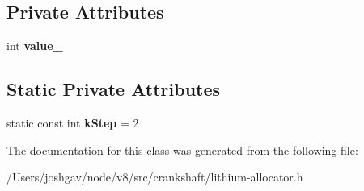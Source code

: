 \subsection*{Private Attributes}
\begin{DoxyCompactItemize}
\item 
int {\bfseries value\+\_\+}\hypertarget{classv8_1_1internal_1_1_lifetime_position_a5a4adb37d823ef5e7c13ec62845a44e4}{}\label{classv8_1_1internal_1_1_lifetime_position_a5a4adb37d823ef5e7c13ec62845a44e4}

\end{DoxyCompactItemize}
\subsection*{Static Private Attributes}
\begin{DoxyCompactItemize}
\item 
static const int {\bfseries k\+Step} = 2\hypertarget{classv8_1_1internal_1_1_lifetime_position_aebef422a37c6159c3128f874ae1d6d09}{}\label{classv8_1_1internal_1_1_lifetime_position_aebef422a37c6159c3128f874ae1d6d09}

\end{DoxyCompactItemize}


The documentation for this class was generated from the following file\+:\begin{DoxyCompactItemize}
\item 
/\+Users/joshgav/node/v8/src/crankshaft/lithium-\/allocator.\+h\end{DoxyCompactItemize}
